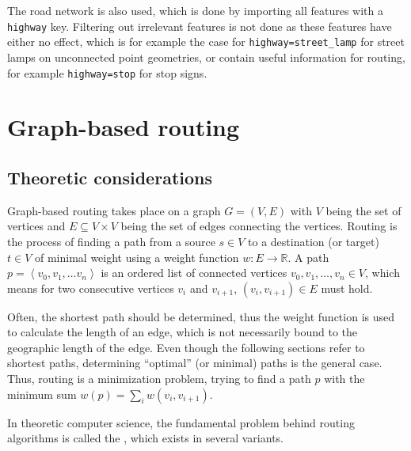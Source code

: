 			The road network is also used, which is done by importing all features with a \texttt{highway} key.
			Filtering out irrelevant features is not done as these features have either no effect, which is for example the case for \texttt{highway=street\_lamp} for street lamps on unconnected point geometries, or contain useful information for routing, for example \texttt{highway=stop} for stop signs.

\section{Graph-based routing}
\label{sec:graph-routing}

	\subsection{Theoretic considerations}
	\label{subsec:routing-theoretic-considerations}	
	
		Graph-based routing takes place on a graph $G=(V, E)$ with $V$ being the set of vertices and $E \subseteq V \times V$ being the set of edges connecting the vertices.
		Routing is the process of finding a path from a source $s \in V$ to a destination (or target) $t \in V$ of minimal weight using a weight function $w: E \rightarrow \mathbb{R}$.
		A path $p=\left\langle v_0, v_1, \dots v_n \right\rangle$ is an ordered list of connected vertices $v_0, v_1, \dots, v_n \in V$, which means for two consecutive vertices $v_i$ and $v_{i+1}$, $(v_i, v_{i+1}) \in E$ must hold.
		
		Often, the shortest path should be determined, thus the weight function is used to calculate the length of an edge, which is not necessarily bound to the geographic length of the edge.
		Even though the following sections refer to shortest paths, determining \enquote{optimal} (or minimal) paths is the general case.
		Thus, routing is a minimization problem, trying to find a path $p$ with the minimum sum $w(p) = \sum_i{w(v_i, v_{i+1})}$\cite[645]{cormen-introduction-to-alg}.
		
		In theoretic computer science, the fundamental problem behind routing algorithms is called the , which exists in several variants\cite[644]{cormen-introduction-to-alg}.
		
		\subsubsection{}
		\label{subsubsec:single-source-shortest-path}
		
